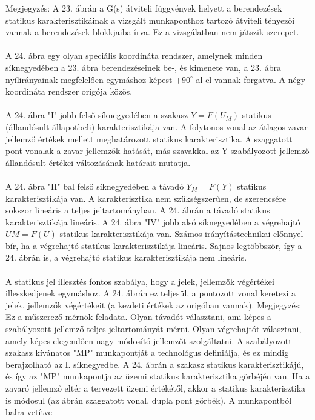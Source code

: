 \documentclass[11pt,a4paper]{article}
\begin{document}
Megjegyzés: A 23. ábrán a G(s) átviteli függvények helyett a berendezések statikus
karakterisztikáinak a vizsgált munkaponthoz tartozó átviteli tényezői vannak a
berendezések blokkjaiba írva. Ez a vizsgálatban nem játszik szerepet.
\\\\
A 24. ábra egy olyan speciális koordináta rendszer, amelynek minden
síknegyedében a 23. ábra berendezéseinek be-, és kimenete van, a 23. ábra nyílirányainak
megfelelően egymáshoz képest $+90^\circ$-al el vannak forgatva. A négy koordináta rendszer origója közös.
\\\\
A 24. ábra "I" jobb felső síknegyedében a szakasz $Y=F\left(U_M\right)$ statikus (állandósult
állapotbeli) karakterisztikája van. A folytonos vonal az átlagos zavar jellemző értékek
mellett meghatározott statikus karakterisztika. A szaggatott pont-vonalak a zavar
jellemzők hatását, más szavakkal az Y szabályozott jellemző állandósult értékei változásának
határait mutatja.
\\\\
A 24. ábra "II" bal felső síknegyedében a távadó $Y_M =F\left(Y\right)$ statikus karakterisztikája
van. A karakterisztika nem szükségszerűen, de szerencsére sokszor lineáris a
teljes jeltartományban. A 24. ábrán a távadó statikus karakterisztikája lineáris.
A 24. ábra "IV" jobb alsó síknegyedében a végrehajtó $UM =F\left(U\right)$ statikus karakterisztikája
van. Számos irányítástechnikai előnnyel bír, ha a végrehajtó statikus karakterisztikája lineáris. Sajnos legtöbbször, így a 24. ábrán is, a végrehajtó statikus karakterisztikája nem lineáris.
\\\\
A statikus jel illesztés fontos szabálya, hogy a jelek, jellemzők végértékei illeszkedjenek
egymáshoz. A 24. ábrán ez teljesül, a pontozott vonal keretezi a jelek,
jellemzők végértékeit (a kezdeti értékek az origóban vannak).
Megjegyzés: Ez a műszerező mérnök feladata. Olyan távadót választani, ami
képes a szabályozott jellemző teljes jeltartományát mérni. Olyan végrehajtót választani,
amely képes elegendően nagy módosító jellemzőt szolgáltatni.
A szabályozott szakasz kívánatos "MP" munkapontját a technológus definiálja,
és ez mindig berajzolható az I. síknegyedbe. A 24. ábrán a szakasz statikus karakterisztikájú,
és így az "MP" munkapontja az üzemi statikus karakterisztika görbéjén van.
Ha a zavaró jellemző eltér a tervezett üzemi értékétől, akkor a statikus karakterisztika
is módosul (az ábrán szaggatott vonal, dupla pont görbék). A munkapontból balra vetítve
\end{document}
